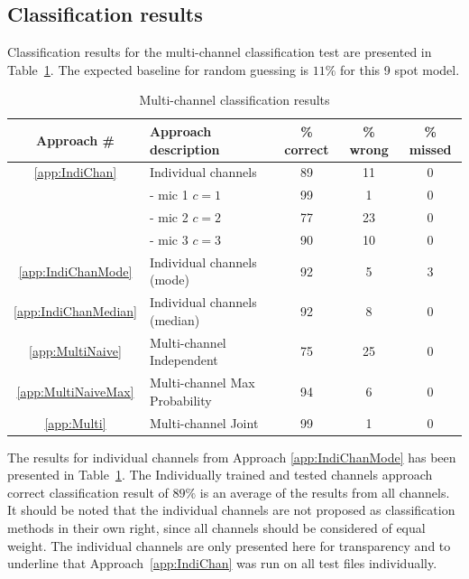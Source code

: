 \subsection{Classification results}\label{sec:MultiAPRResultsClass}
Classification results for the multi-channel classification test are presented in Table~\ref{tab:multiAPRresults}. The expected baseline for random guessing is $11 \%$ for this 9 spot model.
\begin{table}\begin{center}
\caption{Multi-channel classification results}
\label{tab:multiAPRresults}
\begin{tabular}{|c|l|c|c|c|}\hline
Approach \#             & Approach description          & \% correct    & \% wrong  & \% missed  \\ \hline
\ref{app:IndiChan}      & Individual channels           & 89            & 11        & 0          \\
                        &  - mic 1 $c = 1$              & 99            & 1         & 0          \\
                        &  - mic 2 $c = 2$              & 77            & 23        & 0          \\
                        &  - mic 3 $c = 3$              & 90            & 10        & 0          \\
\ref{app:IndiChanMode}  & Individual channels (mode)    & 92            & 5         & 3          \\
\ref{app:IndiChanMedian}& Individual channels (median)  & 92            & 8         & 0          \\
\ref{app:MultiNaive}    & Multi-channel Independent     & 75            & 25        & 0          \\
\ref{app:MultiNaiveMax} & Multi-channel Max Probability & 94            & 6         & 0          \\
\ref{app:Multi}         & Multi-channel Joint           & 99            & 1         & 0          \\ \hline
\end{tabular}\end{center}\end{table}

The results for individual channels from Approach \ref{app:IndiChanMode} has been presented in Table~\ref{tab:multiAPRresults}. The Individually trained and tested channels approach correct classification result of $89\%$ is an average of the results from all channels. It should be noted that the individual channels are not proposed as classification methods in their own right, since all channels should be considered of equal weight. The individual channels are only presented here for transparency and to underline that Approach~\ref{app:IndiChan} was run on all test files individually.

